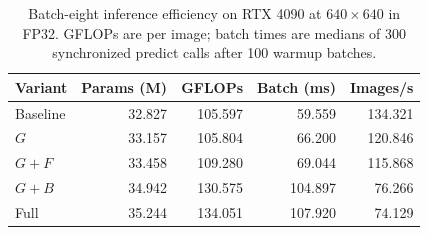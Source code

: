 
\begin{table}[t]
\centering
\caption{Batch-eight inference efficiency on RTX 4090 at $640\times640$ in FP32. GFLOPs are per image; batch times are medians of 300 synchronized predict calls after 100 warmup batches.}
\label{tab:efficiency}
\small\setlength{\tabcolsep}{2.5pt}
\begin{tabular*}{\columnwidth}{@{\extracolsep{\fill}}lrrrr@{}}
\toprule
Variant & Params (M) & GFLOPs & Batch (ms) & Images/s \\
\midrule
Baseline & 32.827 & 105.597 & 59.559 & 134.321 \\
$G$ & 33.157 & 105.804 & 66.200 & 120.846 \\
$G+F$ & 33.458 & 109.280 & 69.044 & 115.868 \\
$G+B$ & 34.942 & 130.575 & 104.897 & 76.266 \\
Full & 35.244 & 134.051 & 107.920 & 74.129 \\
\bottomrule
\end{tabular*}
\end{table}
